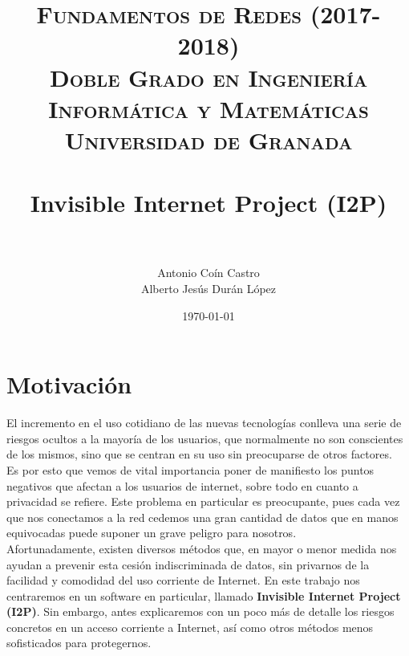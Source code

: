 


\title{	
	\normalfont \normalsize 
	\textsc{\textbf{Fundamentos de Redes (2017-2018)} \\ Doble Grado en Ingeniería Informática y Matemáticas \\ Universidad de Granada} \\ [25pt] 
	\horrule{0.5pt} \\[0.4cm]
	\huge Invisible Internet Project (I2P) \\ 
	\horrule{2pt} \\[0.5cm] 
}

\author{Antonio Coín Castro \\ Alberto Jesús Durán López} 
\date{\normalsize\today} %



	\maketitle       %
	\newpage 
	\tableofcontents %
	\newpage
	
	\section{Motivación} %
	El incremento en el uso cotidiano de las nuevas tecnologías conlleva una serie de riesgos ocultos a la mayoría de los usuarios, que normalmente no son conscientes de los mismos, sino que se centran en su uso sin preocuparse de otros factores.\\
	
	Es por esto que vemos de vital importancia poner de manifiesto los puntos negativos que afectan a los usuarios de internet, sobre todo en cuanto a privacidad se refiere. Este problema en particular es preocupante, pues cada vez que nos conectamos a la red cedemos una gran cantidad de datos que en manos equivocadas puede suponer un grave peligro para nosotros.\\
	
	Afortunadamente, existen diversos métodos que, en mayor o menor medida nos ayudan a prevenir esta cesión indiscriminada de datos, sin privarnos de la facilidad y comodidad del uso corriente de Internet. En este trabajo nos centraremos en un software en particular, llamado \textbf{Invisible Internet Project (I2P)}. Sin embargo, antes explicaremos con un poco más de detalle los riesgos concretos en un acceso corriente a Internet, así como otros métodos menos sofisticados para protegernos.
	
